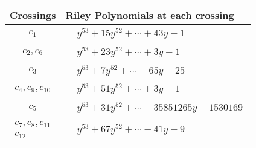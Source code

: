 \documentclass[1p]{elsarticle_modified}
\theoremstyle{definition}
\begin{document}
\begin{tabular}{m{50pt}|m{274pt}}
Crossings & \hspace{64pt}Riley Polynomials at each crossing \\
\hline $$\begin{aligned}c_{1}\end{aligned}$$&$\begin{aligned}
&y^{53}+15 y^{52}+\cdots+43 y-1
\end{aligned}$\\
\hline $$\begin{aligned}c_{2},c_{6}\end{aligned}$$&$\begin{aligned}
&y^{53}+23 y^{52}+\cdots+3 y-1
\end{aligned}$\\
\hline $$\begin{aligned}c_{3}\end{aligned}$$&$\begin{aligned}
&y^{53}+7 y^{52}+\cdots-65 y-25
\end{aligned}$\\
\hline $$\begin{aligned}c_{4},c_{9},c_{10}\end{aligned}$$&$\begin{aligned}
&y^{53}+51 y^{52}+\cdots+3 y-1
\end{aligned}$\\
\hline $$\begin{aligned}c_{5}\end{aligned}$$&$\begin{aligned}
&y^{53}+31 y^{52}+\cdots-35851265 y-1530169
\end{aligned}$\\
\hline $$\begin{aligned}c_{7},c_{8},c_{11}\\c_{12}\end{aligned}$$&$\begin{aligned}
&y^{53}+67 y^{52}+\cdots-41 y-9
\end{aligned}$\\
\hline
\end{tabular}
\vskip 2pc
\end{document}
